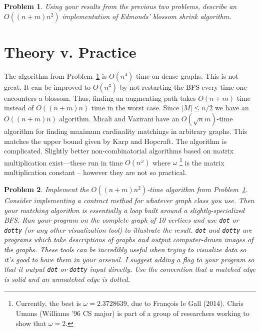 \documentclass[11pt]{article}
\newtheorem{problem}{Problem}
\begin{document}
\begin{problem} \label{problem:alg}
Using your results from the previous two problems, describe an $O((n+m)n^{2})$ implementation of Edmonds' blossom shrink algorithm.
\end{problem}

\section{Theory v. Practice}

The algorithm from Problem~\ref{problem:alg} is $O(n^{4})$-time on dense graphs.  This is not great.  It can be improved to $O(n^{3})$ by not restarting the BFS every time one encounters a blossom.  Thus, finding an augmenting path takes $O(n+m)$ time instead of $O((n+m)n)$ time in the worst case.  Since $|M| \leq n/2$ we have an $O((n+m)n)$ algorithm.  Micali and Vazirani have an $O(\sqrt{n}m)$-time algorithm for finding maximum cardinality matchings in arbitrary graphs.  This matches the upper bound given by Karp and Hopcraft.  The algorithm is complicated.  Slightly better non-combinatorial algorithms based on matrix multiplication exist---these run in time $O(n^{\omega})$ where $\omega$
\footnote{Currently, the best is $\omega = 2.3728639$, due to Fran\c{c}ois le Gall (2014). Chris Umans (Williams '96
CS major) is part of a group of researchers working to show that $\omega = 2$.}
 is the matrix multiplication constant -- however they are not so practical.

\begin{problem} \label{prob:impl}
Implement the $O((n+m)n^{2})$-time algorithm from Problem~\ref{problem:alg}.  Consider implementing a {\em contract} method for whatever graph class you use.  Then your matching algorithm is essentially a loop built around a slightly-specialized BFS.   Run your program on the complete graph of 10 vertices and use {\tt dot} or {\tt dotty} (or any other visualization tool) to illustrate the result.  {\tt dot} and {\tt dotty} are programs which take descriptions of graphs and output computer-drawn images of the graphs.  These tools can be incredibly useful when trying to visualize data so it's good to have them in your arsenal.  I suggest adding a flag to your program so that it output {\tt dot} or {\tt dotty} input directly.  Use the convention that a matched edge is solid and an unmatched edge is dotted.
\end{problem}

\iffalse %
\begin{problem}[Extra Credit]
Describe and implement the $O((n+m)n)$ algorithm that does not start a BFS over once a blossom is encountered.   Provide some empirical evidence that your algorithm runs in the stated time.  {\em Note:  implementing this version of the algorithm means you do not need to implement the version from Problem~\ref{prob:impl}, but you still need to produce the graphs}.
\end{problem}
\fi %



\end{document}
